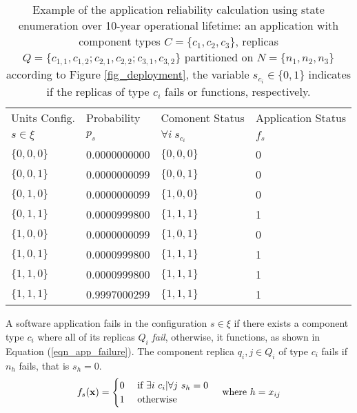 \begin{table}
	\centering
	\begin{tabular}{@{}llll@{}}
		\toprule
		Units Config. & Probability & Comonent Status & Application Status \\ 
		$s\in\xi$   & $p_s$     & $\forall i\ s_{c_i}$ & $f_s$ \\ \midrule
		$\{0,0,0\}$ & 0.0000000000 & $\{0, 0, 0\}$        & 0     \\
		$\{0,0,1\}$ & 0.0000000099 & $\{0, 0, 1\}$         & 0     \\
		$\{0,1,0\}$ & 0.0000000099 & $\{1, 0, 0\}$          & 0     \\
		$\{0,1,1\}$  & 0.0000999800 & $\{1, 1, 1\}$         & 1     \\
		$\{1,0,0\}$ & 0.0000000099 &$\{1, 0, 1\}$         & 0    \\
		$\{1,0,1\}$ & 0.0000999800 & $\{1, 1, 1\}$        & 1     \\
		$\{1,1,0\}$ & 0.0000999800 & $\{1, 1, 1\}$          & 1     \\
		$\{1,1,1\}$ & 0.9997000299 & $\{1, 1, 1\}$           & 1     \\ \bottomrule
	\end{tabular}
	\caption{Example of the application reliability calculation using state enumeration over 10-year operational lifetime: an application with component types $C=\{c_1,c_2,c_3\}$, replicas $Q=\{c_{1,1},c_{1,2};c_{2,1},c_{2,2};c_{3,1},c_{3,2}\}$ partitioned on $N=\{n_1,n_2,n_3\}$ according to Figure \ref{fig_deployment}, the variable $s_{c_i}\in\{0,1\}$ indicates if the replicas of type $c_i$ fails or functions, respectively.}
	\label{tbl_application_rel}
\end{table}

\begin{definition}
	A software application fails in the configuration $s\in\xi$ if there exists a component type $c_i$ where all of its replicas $Q_i$ \textit{fail}, otherwise, it functions, as shown in Equation (\ref{eqn_app_failure}).  The component replica $q_i,j\in Q_i$ of type $c_i$ fails if $n_h$ fails, that is $s_h=0$.
	\begin{align}
	\label{eqn_app_failure}
	f_s(\textbf{x})&= 
	\begin{cases}                                           
	0 & \mbox{ if } \exists i\ c_i|\forall j\ s_h=0\\
	1 & \mbox{ otherwise }
	\end{cases}&\mbox{ where }h=x_{ij}
	\end{align}
\end{definition}

